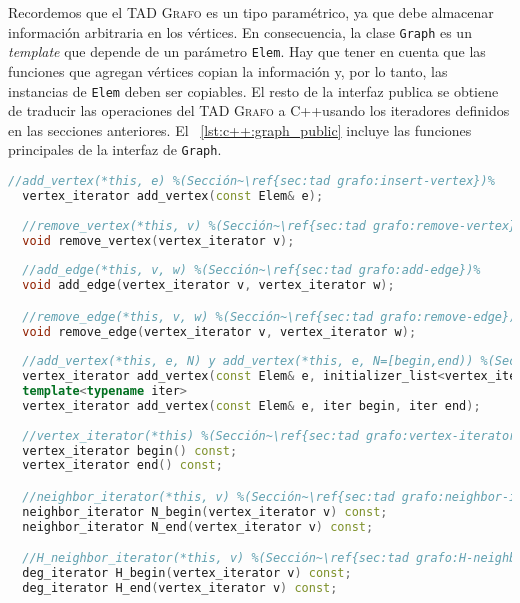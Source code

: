 \documentclass[%
    a4paper,%
    fontsize=12pt,%
    DIV=12,
    twoside,%
    openright,%
    titlepage=true,%
    headsepline,%
    toc=bibliography,%
    parskip=half,%
    cleardoublepage=empty,%
    headings=big,%
]{scrbook}
\makeatletter
\newcommand{\Grafo}{\textsc{Grafo}\xspace}
\newcommand{\CPPCode}[1]{\lstinline[language=C++,basicstyle={\ttfamily}]@#1@}
\newcommand{\Graph}{\CPPCode{Graph}\xspace}
\DeclareRobustCommand{\CPP}{C\nolinebreak[4]\hspace{-.05em}\raisebox{.4ex}{\relsize{-3}\textbf{++}}\xspace}
\def\CPP{C++}%
\makeatother
\begin{document}
Recordemos que el TAD \Grafo es un tipo paramétrico, ya que debe almacenar información arbitraria en los vértices.  En consecuencia, la clase \Graph es un \emph{template} que depende de un parámetro \CPPCode{Elem}.  Hay que tener en cuenta que las funciones que agregan vértices copian la información y, por lo tanto, las instancias de \CPPCode{Elem} deben ser copiables.  El resto de la interfaz publica se obtiene de traducir las operaciones del TAD \Grafo a \CPP usando los iteradores definidos en las secciones anteriores.  El \lstlistingname~\ref{lst:c++:graph_public} incluye las funciones principales de la interfaz de \CPPCode{Graph}.

\begin{lstlisting}[caption={Interfaz de la clase \CPPCode{Graph}.},gobble=2,name=graph_public,float=h,label={lst:c++:graph_public},language=C++,xleftmargin=1em,xrightmargin=1em]
  //add_vertex(*this, e) %(Sección~\ref{sec:tad grafo:insert-vertex})%
  vertex_iterator add_vertex(const Elem& e);
  
  //remove_vertex(*this, v) %(Sección~\ref{sec:tad grafo:remove-vertex})%
  void remove_vertex(vertex_iterator v);
  
  //add_edge(*this, v, w) %(Sección~\ref{sec:tad grafo:add-edge})%
  void add_edge(vertex_iterator v, vertex_iterator w);

  //remove_edge(*this, v, w) %(Sección~\ref{sec:tad grafo:remove-edge})%
  void remove_edge(vertex_iterator v, vertex_iterator w);
  
  //add_vertex(*this, e, N) y add_vertex(*this, e, N=[begin,end)) %(Sección~\ref{sec:tad grafo:add-vertex})%
  vertex_iterator add_vertex(const Elem& e, initializer_list<vertex_iterator> N)
  template<typename iter>
  vertex_iterator add_vertex(const Elem& e, iter begin, iter end);
  
  //vertex_iterator(*this) %(Sección~\ref{sec:tad grafo:vertex-iterator})%
  vertex_iterator begin() const;
  vertex_iterator end() const;

  //neighbor_iterator(*this, v) %(Sección~\ref{sec:tad grafo:neighbor-iterator})%
  neighbor_iterator N_begin(vertex_iterator v) const;
  neighbor_iterator N_end(vertex_iterator v) const;

  //H_neighbor_iterator(*this, v) %(Sección~\ref{sec:tad grafo:H-neighbors})%
  deg_iterator H_begin(vertex_iterator v) const;
  deg_iterator H_end(vertex_iterator v) const;
\end{lstlisting}
\end{document}
